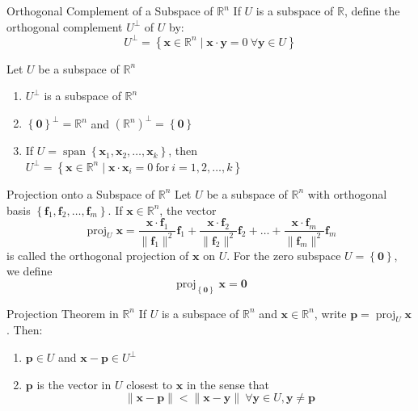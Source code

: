 \documentclass[12pt]{article}
\begin{document}
\begin{definition}{Orthogonal Complement of a Subspace of $ \mathbb{R}^n $}{}
    If $ U $ is a subspace of $ \mathbb{R} $, define the orthogonal complement $ U^\perp $ of $ U $ by:
    \[ U^\perp = \left\{ \mathbf{x} \in \mathbb{R}^n \mid \mathbf{x} \cdot \mathbf{y} = 0 \ \forall \mathbf{y} \in U \right\} \]
\end{definition}

\begin{lemma}{}{}
    Let $ U $ be a subspace of $ \mathbb{R}^n $
    \begin{enumerate}[label=(\roman*)]
        \item $ U^\perp $ is a subspace of $ \mathbb{R}^n $
        \item $ \left\{ \mathbf{0} \right\}^\perp = \mathbb{R}^n $ and $ \left( \mathbb{R}^n \right)^\perp = \left\{ \mathbf{0} \right\} $
        \item If $ U = \operatorname{span} \left\{ \mathbf{x}_1, \mathbf{x}_2, \dots, \mathbf{x}_k \right\} $, then $ U^\perp = \left\{ \mathbf{x} \in \mathbb{R}^n \mid \mathbf{x} \cdot \mathbf{x}_i = 0 \ \text{for} \ i = 1, 2, \dots, k \right\} $
    \end{enumerate}
\end{lemma}

\begin{definition}{Projection onto a Subspace of $ \mathbb{R}^n $}{}
    Let $ U $ be a subspace of $ \mathbb{R}^n $ with orthogonal basis $ \left\{ \mathbf{f}_1, \mathbf{f}_2, \dots, \mathbf{f}_m \right\} $. If $ \mathbf{x} \in \mathbb{R}^n $, the vector
    \[ \operatorname{proj}_U \mathbf{x} = \frac{\mathbf{x} \cdot \mathbf{f}_1}{\lVert \mathbf{f}_1 \rVert^2} \mathbf{f}_1 + \frac{\mathbf{x} \cdot \mathbf{f}_2}{\lVert \mathbf{f}_2 \rVert^2} \mathbf{f}_2 + \dots + \frac{\mathbf{x} \cdot \mathbf{f}_m}{\lVert \mathbf{f}_m \rVert^2} \mathbf{f}_m \]
    is called the orthogonal projection of $ \mathbf{x} $ on $ U $. For the zero subspace $ U = \left\{ \mathbf{0} \right\} $, we define
    \[ \operatorname{proj}_{\left\{ \mathbf{0} \right\}} \mathbf{x} = \mathbf{0} \]
\end{definition}

\begin{theorem}{Projection Theorem in $ \mathbb{R}^n $}{}
    If $ U $ is a subspace of $ \mathbb{R}^n $ and $ \mathbf{x} \in \mathbb{R}^n $, write $ \mathbf{p} = \operatorname{proj}_U \mathbf{x} $. Then:
    \begin{enumerate}[label=(\roman*)]
        \item $ \mathbf{p} \in U $ and $ \mathbf{x} - \mathbf{p} \in U^\perp $
        \item $ \mathbf{p} $ is the vector in $ U $ closest to $ \mathbf{x} $ in the sense that
        \[ \lVert \mathbf{x} - \mathbf{p} \rVert < \lVert \mathbf{x} - \mathbf{y} \rVert \ \forall \mathbf{y} \in U, \mathbf{y} \neq \mathbf{p} \]
    \end{enumerate}
\end{theorem}
\end{document}
